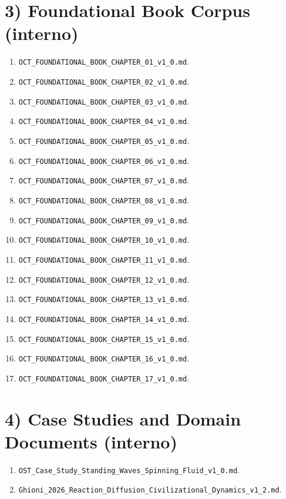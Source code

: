 \section{3) Foundational Book Corpus (interno)}

\begin{enumerate}
\def\labelenumi{\arabic{enumi}.}
\tightlist
\item
  \texttt{OCT\_FOUNDATIONAL\_BOOK\_CHAPTER\_01\_v1\_0.md}.
\item
  \texttt{OCT\_FOUNDATIONAL\_BOOK\_CHAPTER\_02\_v1\_0.md}.
\item
  \texttt{OCT\_FOUNDATIONAL\_BOOK\_CHAPTER\_03\_v1\_0.md}.
\item
  \texttt{OCT\_FOUNDATIONAL\_BOOK\_CHAPTER\_04\_v1\_0.md}.
\item
  \texttt{OCT\_FOUNDATIONAL\_BOOK\_CHAPTER\_05\_v1\_0.md}.
\item
  \texttt{OCT\_FOUNDATIONAL\_BOOK\_CHAPTER\_06\_v1\_0.md}.
\item
  \texttt{OCT\_FOUNDATIONAL\_BOOK\_CHAPTER\_07\_v1\_0.md}.
\item
  \texttt{OCT\_FOUNDATIONAL\_BOOK\_CHAPTER\_08\_v1\_0.md}.
\item
  \texttt{OCT\_FOUNDATIONAL\_BOOK\_CHAPTER\_09\_v1\_0.md}.
\item
  \texttt{OCT\_FOUNDATIONAL\_BOOK\_CHAPTER\_10\_v1\_0.md}.
\item
  \texttt{OCT\_FOUNDATIONAL\_BOOK\_CHAPTER\_11\_v1\_0.md}.
\item
  \texttt{OCT\_FOUNDATIONAL\_BOOK\_CHAPTER\_12\_v1\_0.md}.
\item
  \texttt{OCT\_FOUNDATIONAL\_BOOK\_CHAPTER\_13\_v1\_0.md}.
\item
  \texttt{OCT\_FOUNDATIONAL\_BOOK\_CHAPTER\_14\_v1\_0.md}.
\item
  \texttt{OCT\_FOUNDATIONAL\_BOOK\_CHAPTER\_15\_v1\_0.md}.
\item
  \texttt{OCT\_FOUNDATIONAL\_BOOK\_CHAPTER\_16\_v1\_0.md}.
\item
  \texttt{OCT\_FOUNDATIONAL\_BOOK\_CHAPTER\_17\_v1\_0.md}.
\end{enumerate}

\section{4) Case Studies and Domain Documents (interno)}

\begin{enumerate}
\def\labelenumi{\arabic{enumi}.}
\tightlist
\item
  \texttt{OST\_Case\_Study\_Standing\_Waves\_Spinning\_Fluid\_v1\_0.md}.
\item
  \texttt{Ghioni\_2026\_Reaction\_Diffusion\_Civilizational\_Dynamics\_v1\_2.md}.
\end{enumerate}

